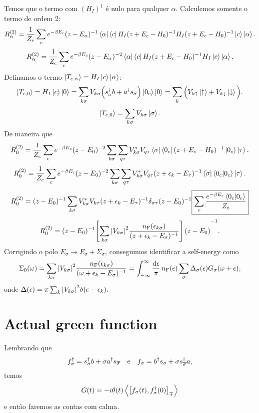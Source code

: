 \documentclass[a4paper,fleqn,12pt]{article}
\renewcommand{\s}{\sigma}
\newcommand{\us}{{\overline{\sigma}}}
\renewcommand{\d}{\dagger}
\newcommand{\nF}{n_\text{F}}
\begin{document}
Temos que o termo com $(H_I)^1$ é nulo para qualquer $\alpha$. Calculemos somente o termo de ordem 2:
$$
R_\alpha^{(2)} = \frac{1}{Z_c} \sum_c e^{-\beta E_c} (z-E_\alpha)^{-1} \bra{\alpha}\bra{c}
H_I (z+E_c - H_0)^{-1} H_I (z+E_c - H_0)^{-1} \ket{c} \ket{\alpha}.
$$
$$
R_\alpha^{(2)} = \frac{1}{Z_c} \sum_c e^{-\beta E_c} (z-E_\alpha)^{-2} \bra{\alpha}\bra{c}
H_I (z+E_c - H_0)^{-1} H_I \ket{c} \ket{\alpha}.
$$
Definamos o termo $\ket{T_{c,\alpha}} = H_I \ket{c} \ket{\alpha}$:
$$
\ket{T_{c,0}} = H_I \ket{c}\ket{0} =
\sum_{k\s} V_{k\s} \Big(
s_{\s}^\d b + a^\d s_{\us}
\Big) \ket{0_c} \ket{0} =
\sum_{k} \Big(
V_{k\up} \ket{\up} + V_{k\dn} \ket{\dn}
\Big).
$$
$$
\ket{T_{c,0}} = \sum_{k\s} V_{k\s} \ket{\sigma}.
$$
De maneira que
$$
R_0^{(2)} = \frac{1}{Z_c} \sum_c e^{-\beta E_c} (z-E_0)^{-2}
\sum_{k\s} \sum_{q\tau} V_{k\s}^* V_{q\tau}
\bra{\sigma} \bra{0_c}
(z+E_c - H_0)^{-1}
\ket{0_c}\ket{\tau}.
$$
$$
R_0^{(2)} = \frac{1}{Z_c} \sum_c e^{-\beta E_c} (z-E_0)^{-2}
\sum_{k\s} \sum_{q\tau} V_{k\s}^* V_{q\tau}
(z + \eps_k - E_\tau)^{-1}
\bra{\sigma} \bra{0_c}
\ket{0_c}\ket{\tau}.
$$
$$
R_0^{(2)} = (z-E_0)^{-1}
\sum_{k\s} V_{k\s}^* V_{k\tau}
(z + \eps_k - E_\tau)^{-1}
\delta_{\s \tau} (z-E_0)^{-1}
\boxed{\sum_c \frac{e^{-\beta E_c }\braket{0_c}{0_c}}{Z_c}}
$$
$$
R_0^{(2)} = (z-E_0)^{-1}
\qty[
\sum_{k\s} \abs{V_{k\s}}^2 \frac{\nF(\eps_{k\s})}{(z + \eps_k - E_\s)^{-1}}
]
(z - E_0)^{-1}.
$$
Corrigindo o polo $E_\s \to E_\s + \Sigma_\s$, conseguimos identificar a self-energy como
$$
\Sigma_0(\omega) =
\sum_{k\s} \abs{V_{k\s}}^2 \frac{\nF(\eps_{k\s})}{(\omega + \eps_k - E_\s)^{-1}} =
\int_{-\infty}^\infty \frac{\dd{\eps}}{\pi} \,
\nF(\eps) \sum_\s \Delta_\s(\eps) G_\s(\omega + \eps),
$$
onde $\Delta(\eps) = \pi \sum_k \abs{V_{k\s}}^2 \delta(\eps - \eps_k)$.

\n


\section{Actual green function}

Lembrando que
$$
f_\s^\d = s_\s^\d b + \s a^\d s_\us \e f_\s = b^\d s_\s + \s s_\us^\d a,
$$
temos
$$
G(t) = -i \theta(t) \zub{f_\s(t)}{f_\s^\d(0)}
$$
e então faremos as contas com calma.
\end{document}
